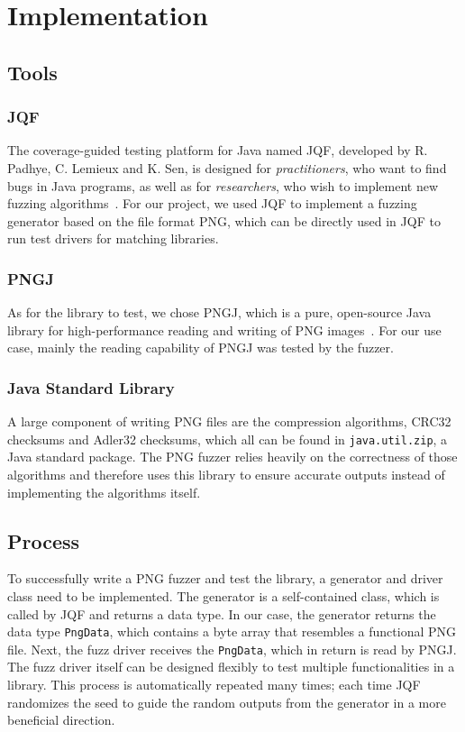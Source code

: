 \documentclass[runningheads]{llncs}
\begin{document}
\section{Implementation}
\subsection{Tools}
\subsubsection{JQF}
The coverage-guided testing platform for Java named JQF, developed by R. Padhye, C. Lemieux and K. Sen, is designed for \textit{practitioners}, who want to find bugs in Java programs, as well as for \textit{researchers}, who wish to implement new fuzzing algorithms~\cite{JQF_paper}. For our project, we used JQF to implement a fuzzing generator based on the file format PNG, which can be directly used in JQF to run test drivers for matching libraries.
\subsubsection{PNGJ}
As for the library to test, we chose PNGJ, which is a pure, open-source Java library for high-performance reading and writing of PNG images~\cite{PNGJ_github}. For our use case, mainly the reading capability of PNGJ was tested by the fuzzer.
\subsubsection{Java Standard Library}
A large component of writing PNG files are the compression algorithms, CRC32 checksums and Adler32 checksums, which all can be found in \texttt{java.util.zip}, a Java standard package. The PNG fuzzer relies heavily on the correctness of those algorithms and therefore uses this library to ensure accurate outputs instead of implementing the algorithms itself.
\subsection{Process}
To successfully write a PNG fuzzer and test the library, a generator and driver class need to be implemented. The generator is a self-contained class, which is called by JQF and returns a data type. In our case, the generator returns the data type \texttt{PngData}, which contains a byte array that resembles a functional PNG file. Next, the fuzz driver receives the \texttt{PngData}, which in return is read by PNGJ. The fuzz driver itself can be designed flexibly to test multiple functionalities in a library. This process is automatically repeated many times; each time JQF randomizes the seed to guide the random outputs from the generator in a more beneficial direction.
\end{document}
